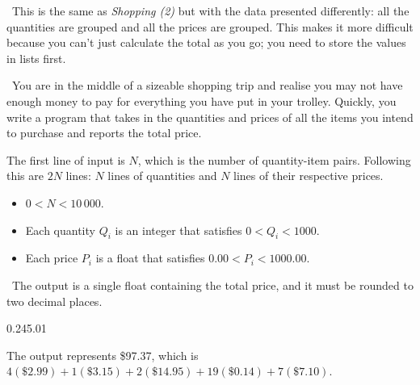 
\Note\ This is the same as \emph{Shopping (2)} but with the data presented differently:
all the quantities are grouped and all the prices are grouped. This makes it more
difficult because you can't just calculate the total as you go; you need to store the
values in lists first.

\Question\ You are in the middle of a sizeable shopping trip and realise you may not have
enough money to pay for everything you have put in your trolley. Quickly, you write a
program that takes in the quantities and prices of all the items you intend to purchase
and reports the total price.

\Input

The first line of input is $N$, which is the number of quantity-item pairs. Following this
are $2N$ lines: $N$ lines of quantities and $N$ lines of their respective prices.

\begin{itemize}
  \item $0 < N < 10\,000$.
  \item Each quantity $Q_i$ is an integer that satisfies $0 < Q_i < 1000$.
  \item Each price $P_i$ is a float that satisfies $0.00 < P_i < 1000.00$.
\end{itemize}

\Output\ The output is a single float containing the total price, and it must be rounded
to two decimal places.%

\Sample

       {0.2}{45.01}

\Explanation The output represents \$97.37, which is $4(\$2.99) + 1(\$3.15) + 2(\$14.95)
+ 19(\$0.14) + 7(\$7.10)$.

